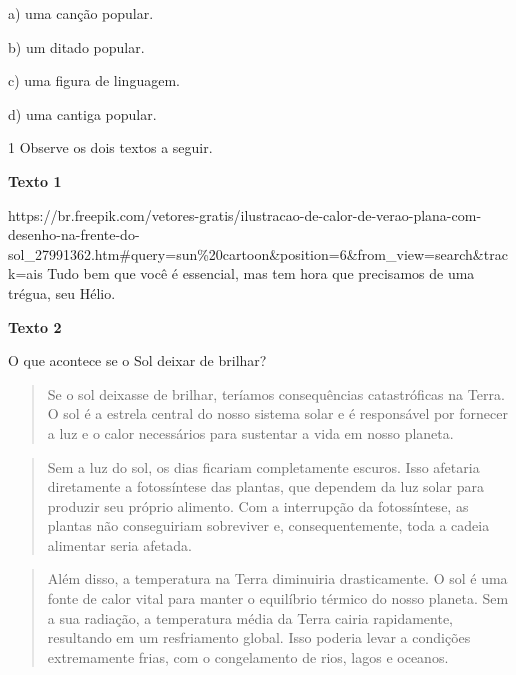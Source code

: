 {a) uma canção popular.

b) um ditado popular.

c) uma figura de linguagem.

d) uma cantiga popular.



\num{1} Observe os dois textos a seguir.

\textbf{Texto 1}

https://br.freepik.com/vetores-gratis/ilustracao-de-calor-de-verao-plana-com-desenho-na-frente-do-sol\_27991362.htm\#query=sun\%20cartoon\&position=6\&from\_view=search\&track=ais
Tudo bem que você é essencial, mas tem hora que precisamos de uma
trégua, seu Hélio.

\textbf{Texto 2}

O que acontece se o Sol deixar de brilhar?

\begin{quote}
Se o sol deixasse de brilhar, teríamos consequências catastróficas na
Terra. O sol é a estrela central do nosso sistema solar e é responsável
por fornecer a luz e o calor necessários para sustentar a vida em nosso
planeta.
\end{quote}

\begin{quote}
Sem a luz do sol, os dias ficariam completamente escuros. Isso afetaria
diretamente a fotossíntese das plantas, que dependem da luz solar para
produzir seu próprio alimento. Com a interrupção da fotossíntese, as
plantas não conseguiriam sobreviver e, consequentemente, toda a cadeia
alimentar seria afetada.
\end{quote}

\begin{quote}
Além disso, a temperatura na Terra diminuiria drasticamente. O sol é uma
fonte de calor vital para manter o equilíbrio térmico do nosso planeta.
Sem a sua radiação, a temperatura média da Terra cairia rapidamente,
resultando em um resfriamento global. Isso poderia levar a condições
extremamente frias, com o congelamento de rios, lagos e oceanos.
\end{quote}

}
